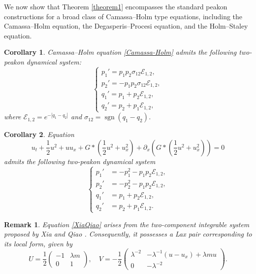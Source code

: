 \documentclass[11pt]{article}
\newtheorem{corollary}{Corollary}
\newtheorem{remark}{Remark}
\begin{document}
We now show that Theorem \ref{theorem1} encompasses the standard peakon constructions for a broad class of Camassa--Holm type equations, including the Camassa–Holm equation, the Degasperis–Procesi equation, and the Holm--Staley equation.
\begin{corollary}
Camassa--Holm equation \eqref{Camassa-Holm} admits the following two-peakon dynamical system:
\begin{equation*}
\begin{cases}
    p_1' = p_1 p_2 \sigma_{12} \mathcal{E}_{1,2}, \\
    p_2' = -p_1 p_2 \sigma_{12} \mathcal{E}_{1,2}, \\
    q_1' = p_1 + p_2 \mathcal{E}_{1,2}, \\
    q_2' = p_2 + p_1 \mathcal{E}_{1,2},
\end{cases}
\end{equation*}
where $\mathcal{E}_{1,2} = e^{-|q_1 - q_2|}$ and $\sigma_{12} = \operatorname{sgn}(q_1 - q_2)$.
\end{corollary}

\begin{corollary}
    Equation
    \begin{equation}
    \label{XiaQiao}
    u_t + \frac{1}{2} u^2 + u u_x + G \ast \left( \frac{1}{2}u^2 + u_x^2 \right) +  \partial_x \left( G \ast  \left( \frac{1}{2} u^2
+ u_x^2 \right) \right) = 0    
    \end{equation}
    admits the following two-peakon dynamical system
\begin{equation*}
        \left\{
\begin{aligned}
    p_1' &= -  p_1^2 - p_1 p_2  \mathcal{E}_{1,2},  \\
    p_2' &= -  p_2^2 - p_1 p_2  \mathcal{E}_{1,2},  \\
    q_1' & =  p_1 +  p_2  \mathcal{E}_{1,2}, \\
    q_2' & =  p_2 +  p_1 \mathcal{E}_{1,2}.
\end{aligned}
\right.
\label{2peakonsystem}
\end{equation*}


\end{corollary}
\begin{remark}
Equation \eqref{XiaQiao} arises from the two-component integrable system proposed by Xia and Qiao \cite{xia2015new}. Consequently, it possesses a Lax pair corresponding to its local form, given by
\begin{equation*}
    U = \frac{1}{2} \begin{pmatrix}
    -1 & \lambda m \\
    0 & 1
    \end{pmatrix}, \quad
    V = -\frac{1}{2} \begin{pmatrix}
    \lambda^{-2} & -\lambda^{-1}(u - u_x) + \lambda m u \\
    0 & -\lambda^{-2}
    \end{pmatrix}.
\end{equation*}
\end{remark}
\end{document}
